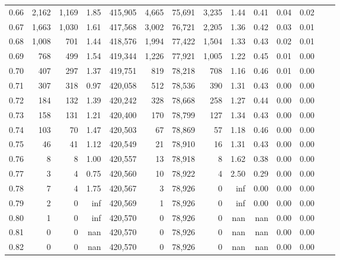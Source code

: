 \begin{tabular}{rrrrrrrrrrrrrr}
0.66 &   2,162 &  1,169 &    1.85 &  415,905 &    4,665 &  75,691 &   3,235 &  1.44 &  0.41 &  0.04 &      0.02 \\
0.67 &   1,663 &  1,030 &    1.61 &  417,568 &    3,002 &  76,721 &   2,205 &  1.36 &  0.42 &  0.03 &      0.01 \\
0.68 &   1,008 &    701 &    1.44 &  418,576 &    1,994 &  77,422 &   1,504 &  1.33 &  0.43 &  0.02 &      0.01 \\
0.69 &     768 &    499 &    1.54 &  419,344 &    1,226 &  77,921 &   1,005 &  1.22 &  0.45 &  0.01 &      0.00 \\
0.70 &     407 &    297 &    1.37 &  419,751 &      819 &  78,218 &     708 &  1.16 &  0.46 &  0.01 &      0.00 \\
0.71 &     307 &    318 &    0.97 &  420,058 &      512 &  78,536 &     390 &  1.31 &  0.43 &  0.00 &      0.00 \\
0.72 &     184 &    132 &    1.39 &  420,242 &      328 &  78,668 &     258 &  1.27 &  0.44 &  0.00 &      0.00 \\
0.73 &     158 &    131 &    1.21 &  420,400 &      170 &  78,799 &     127 &  1.34 &  0.43 &  0.00 &      0.00 \\
0.74 &     103 &     70 &    1.47 &  420,503 &       67 &  78,869 &      57 &  1.18 &  0.46 &  0.00 &      0.00 \\
0.75 &      46 &     41 &    1.12 &  420,549 &       21 &  78,910 &      16 &  1.31 &  0.43 &  0.00 &      0.00 \\
0.76 &       8 &      8 &    1.00 &  420,557 &       13 &  78,918 &       8 &  1.62 &  0.38 &  0.00 &      0.00 \\
0.77 &       3 &      4 &    0.75 &  420,560 &       10 &  78,922 &       4 &  2.50 &  0.29 &  0.00 &      0.00 \\
0.78 &       7 &      4 &    1.75 &  420,567 &        3 &  78,926 &       0 &   inf &  0.00 &  0.00 &      0.00 \\
0.79 &       2 &      0 &     inf &  420,569 &        1 &  78,926 &       0 &   inf &  0.00 &  0.00 &      0.00 \\
0.80 &       1 &      0 &     inf &  420,570 &        0 &  78,926 &       0 &   nan &   nan &  0.00 &      0.00 \\
0.81 &       0 &      0 &     nan &  420,570 &        0 &  78,926 &       0 &   nan &   nan &  0.00 &      0.00 \\
0.82 &       0 &      0 &     nan &  420,570 &        0 &  78,926 &       0 &   nan &   nan &  0.00 &      0.00 \\

\end{tabular}
